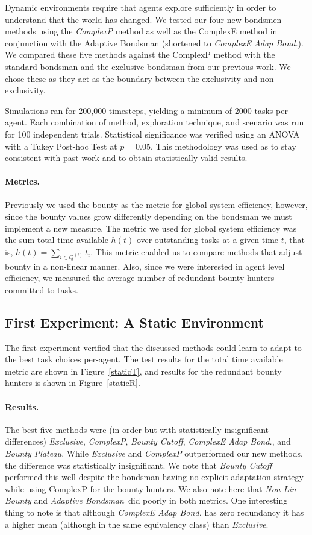 \documentclass[letterpaper]{aamas2015}
\newcommand\paragrapha[1]{\paragraph*{{#1}.}}
\newcommand\bump{\vspace{10in}}
\begin{document}
Dynamic environments require that agents explore sufficiently in order to understand that the world has changed.  We tested our four new bondsmen methods using the \textit{ComplexP} method as well as the ComplexE method in conjunction with the Adaptive Bondsman (shortened to \textit{ComplexE Adap Bond.}).  We compared these five methods against the ComplexP method with the standard bondsman and the exclusive bondsman from our previous work.  We chose these as they act as the boundary between the exclusivity and non-exclusivity.  

Simulations ran for 200,000 timesteps, yielding a minimum of 2000 tasks per agent. Each combination of method, exploration technique, and scenario was run for 100 independent trials.  Statistical significance was verified using an ANOVA with a Tukey Post-hoc Test at \(p=0.05\).  This methodology was used as to stay consistent with past work and to obtain statistically valid results.  

\paragrapha{Metrics}
Previously we used the bounty as the metric for global system efficiency, however, since the bounty values grow differently depending on the bondsman we must implement a new measure.  The metric we used for global system efficiency was the sum total time available \(h(t)\) over outstanding tasks at a given time \(t\), that is, \(h(t) =\sum_{i\in Q^{(t)}}t_i\).  This metric enabled us to compare methods that adjust bounty in a non-linear manner.  Also, since we were interested in agent level efficiency, we measured the average number of redundant bounty hunters committed to tasks.


\subsection{First Experiment: A Static Environment}

The first experiment verified that the discussed methods could learn to adapt to the best task choices per-agent.  
The test results for the total time available metric are shown in Figure~\ref{staticT}, and results for the redundant bounty hunters is shown in Figure~\ref{staticR}.



\paragrapha{Results}


The best five methods were (in order but with statistically insignificant differences) {\it Exclusive}, {\it ComplexP}, {\it Bounty Cutoff},  {\it ComplexE Adap Bond.}, and {\it Bounty Plateau}.  While \textit{Exclusive} and \textit{ComplexP} outperformed our new methods, the difference was statistically insignificant.  We note that {\it Bounty Cutoff} performed this well despite the bondsman having no explicit adaptation strategy while using ComplexP for the bounty hunters.  We also note here that {\it Non-Lin Bounty} and {\it Adaptive Bondsman}\, did poorly in both metrics.  One interesting thing to note is that although {\it ComplexE Adap Bond.} has zero redundancy it has a higher mean (although in the same equivalency class) than {\it Exclusive}.
\end{document}
